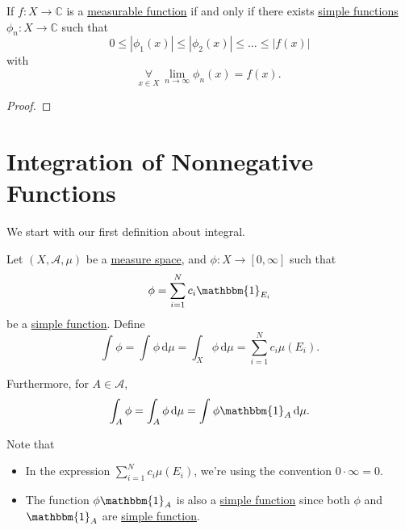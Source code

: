 \begin{corollary}
	If \(f\colon X\to \mathbb{C} \) is a \hyperref[def:measurable-function]{measurable function} if and only if there exists
	\hyperref[def:simple-function]{simple functions} \(\phi _{n}\colon X\to \mathbb{C}\) such that
	\[
		0\leq \left\vert \phi _1(x) \right\vert \leq \left\vert \phi _2(x) \right\vert \leq \dots \leq \left\vert f(x) \right\vert
	\]
	with
	\[
		\underset{x\in X}{\forall }\ \lim_{n \to \infty} \phi _{n}(x) = f(x).
	\]
\end{corollary}
\begin{proof}
\end{proof}

\section{Integration of Nonnegative Functions}
We start with our first definition about integral.
\begin{definition}\label{def:integration-of-nonnegative-function}
	Let \((X, \mathcal{A}, \mu  )\) be a \hyperref[def:measure-space]{measure space}, and \(\phi\colon X\to [0, \infty ]\) such that
	\[
		\phi  = \sum_{i=1}^{N} c_{i}\mathbbm{1}_{E_{i}}
	\]
	be a \hyperref[def:simple-function]{simple function}. Define
	\[
		\int_{}^{} \phi = \int_{}^{} \phi  \,\mathrm{d}\mu = \int_{X}^{} \phi  \,\mathrm{d}\mu = \sum_{i=1}^{N} c_{i}\mu (E_{i}).
	\]

	\par Furthermore, for \(A\in \mathcal{A} \),
	\[
		\int_{A}^{} \phi = \int_{A}^{} \phi  \,\mathrm{d}\mu = \int_{}^{} \phi \mathbbm{1}_{A}  \,\mathrm{d}\mu.
	\]
\end{definition}
\begin{note}
	Note that
	\begin{itemize}
		\item In the expression \(\sum_{i=1}^{N} c_{i}\mu (E_{i})\), we're using the convention \(0\cdot \infty = 0\).
		\item The function \(\phi \mathbbm{1}_{A} \) is also a \hyperref[def:simple-function]{simple function} since both \(\phi \) and
		      \(\mathbbm{1}_{A} \) are \hyperref[def:simple-function]{simple function}.
	\end{itemize}
\end{note}

